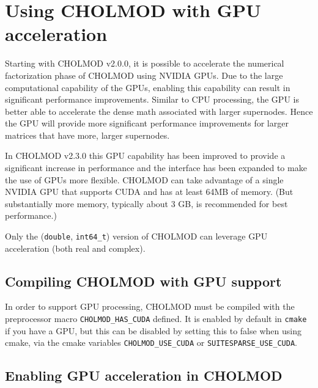 \documentclass[11pt]{article}
\begin{document}
\section{Using CHOLMOD with GPU acceleration}

Starting with CHOLMOD v2.0.0, it is possible to accelerate the numerical
factorization phase of CHOLMOD using NVIDIA GPUs.  Due to the large
computational capability of the GPUs, enabling this capability can result in
significant performance improvements.  Similar to CPU processing, the GPU is
better able to accelerate the dense math associated with larger supernodes.
Hence the GPU will provide more significant performance improvements for larger
matrices that have more, larger supernodes.

In CHOLMOD v2.3.0 this GPU capability has been improved to provide a
significant increase in performance and the interface has been expanded to make
the use of GPUs more flexible.  CHOLMOD can take advantage of a single NVIDIA
GPU that supports CUDA and has at least 64MB of memory.  (But substantially
more memory, typically about 3 GB, is recommended for best performance.)

Only the ({\tt double}, {\tt int64\_t}) version of CHOLMOD can leverage GPU
acceleration (both real and complex).

\subsection{Compiling CHOLMOD with GPU support}

In order to support GPU processing, CHOLMOD must be compiled with the
preprocessor macro \verb'CHOLMOD_HAS_CUDA' defined.  It is enabled by default
in {\tt cmake} if you have a GPU, but this can be disabled by setting this to
false when using cmake, via the cmake variables \verb'CHOLMOD_USE_CUDA'
or \verb'SUITESPARSE_USE_CUDA'.

\subsection{Enabling GPU acceleration in CHOLMOD}
\end{document}
